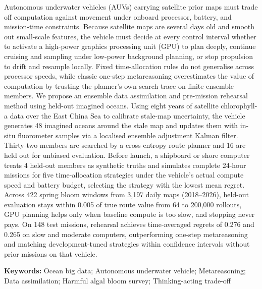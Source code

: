 Autonomous underwater vehicles (AUVs) carrying satellite prior maps must trade off computation against movement under onboard processor, battery, and mission-time constraints. Because satellite maps are several days old and smooth out small-scale features, the vehicle must decide at every control interval whether to activate a high-power graphics processing unit (GPU) to plan deeply, continue cruising and sampling under low-power background planning, or stop propulsion to drift and resample locally. Fixed time-allocation rules do not generalise across processor speeds, while classic one-step metareasoning overestimates the value of computation by trusting the planner's own search trace on finite ensemble members. We propose an ensemble data assimilation and pre-mission rehearsal method using held-out imagined oceans. Using eight years of satellite chlorophyll-a data over the East China Sea to calibrate stale-map uncertainty, the vehicle generates 48 imagined oceans around the stale map and updates them with in-situ fluorometer samples via a localised ensemble adjustment Kalman filter. Thirty-two members are searched by a cross-entropy route planner and 16 are held out for unbiased evaluation. Before launch, a shipboard or shore computer treats 4 held-out members as synthetic truths and simulates complete 24-hour missions for five time-allocation strategies under the vehicle's actual compute speed and battery budget, selecting the strategy with the lowest mean regret. Across 422 spring bloom windows from 3,197 daily maps (2018--2026), held-out evaluation stays within 0.005 of true route value from 64 to 200,000 rollouts, GPU planning helps only when baseline compute is too slow, and stopping never pays. On 148 test missions, rehearsal achieves time-averaged regrets of 0.276 and 0.265 on slow and moderate computers, outperforming one-step metareasoning and matching development-tuned strategies within confidence intervals without prior missions on that vehicle.

\vspace{1em}
\noindent\textbf{Keywords: }Ocean big data; Autonomous underwater vehicle; Metareasoning; Data assimilation; Harmful algal bloom survey; Thinking-acting trade-off

